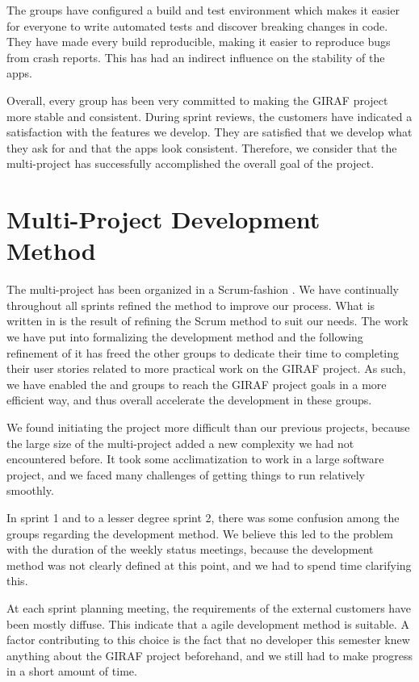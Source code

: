 The \bd{} groups have configured a build and test environment which makes it easier for everyone to write automated tests and discover breaking changes in code. They have made every build reproducible, making it easier to reproduce bugs from crash reports. This has had an indirect influence on the stability of the apps.

Overall, every group has been very committed to making the GIRAF project more stable and consistent. During sprint reviews, the customers have indicated a satisfaction with the features we develop. They are satisfied that we develop what they ask for and that the apps look consistent. Therefore, we consider that the multi-project has successfully accomplished the overall goal of the project.

\section{Multi-Project Development Method}\label{conc:multi_project_process_eval}
The multi-project has been organized in a Scrum-fashion . We have continually throughout all sprints refined the method to improve our process. What is written in  is the result of refining the Scrum method to suit our needs. The work we have put into formalizing the development method and the following refinement of it has freed the other groups to dedicate their time to completing their user stories related to more practical work on the GIRAF project. As such, we have enabled the \gui and \db groups to reach the GIRAF project goals in a more efficient way, and thus overall accelerate the development in these groups.

We found initiating the project more difficult than our previous projects, because the large size of the multi-project added a new complexity we had not encountered before. It took some acclimatization to work in a large software project, and we faced many challenges of getting things to run relatively smoothly.  

In sprint 1 and to a lesser degree sprint 2, there was some confusion among the groups regarding the development method. We believe this led to the problem with the duration of the weekly status meetings, because the development method was not clearly defined at this point, and we had to spend time clarifying this. 

At each sprint planning meeting, the requirements of the external customers have been mostly diffuse. This indicate that a agile development method is suitable. A factor contributing to this choice is the fact that no developer this semester knew anything about the GIRAF project beforehand, and we still had to make progress in a short amount of time.

